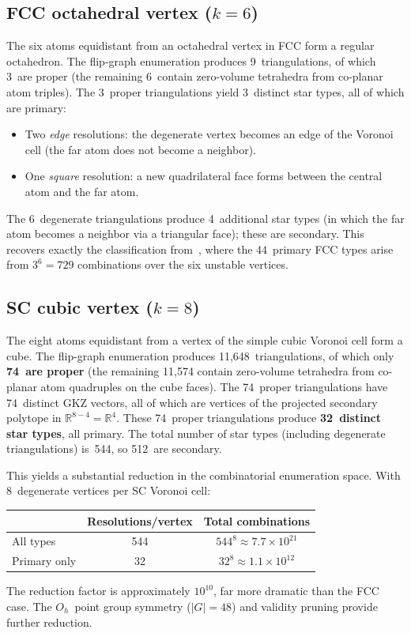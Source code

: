 \documentclass[11pt]{article}
\newcommand{\R}{\mathbb{R}}
\theoremstyle{definition}
\begin{document}
\subsection{FCC octahedral vertex ($k = 6$)}

The six atoms equidistant from an octahedral vertex in FCC form a
regular octahedron.  The flip-graph enumeration produces 9~triangulations,
of which 3~are proper (the remaining 6~contain zero-volume tetrahedra
from co-planar atom triples).  The 3~proper triangulations yield 3~distinct
star types, all of which are primary:
\begin{itemize}
  \item Two \emph{edge} resolutions: the degenerate vertex becomes an
    edge of the Voronoi cell (the far atom does not become a neighbor).
  \item One \emph{square} resolution: a new quadrilateral face forms
    between the central atom and the far atom.
\end{itemize}
The 6~degenerate triangulations produce 4~additional star types (in
which the far atom becomes a neighbor via a triangular face); these are
secondary.  This recovers exactly the classification
from~\cite{lazar2015}, where the 44~primary FCC types arise from
$3^6 = 729$ combinations over the six unstable vertices.

\subsection{SC cubic vertex ($k = 8$)}

The eight atoms equidistant from a vertex of the simple cubic Voronoi
cell form a cube.  The flip-graph enumeration produces
11{,}648~triangulations, of which only \textbf{74~are proper} (the
remaining 11{,}574 contain zero-volume tetrahedra from co-planar atom
quadruples on the cube faces).  The 74~proper triangulations have
74~distinct GKZ vectors, all of which are vertices of the projected
secondary polytope in $\R^{8-4} = \R^4$.  These 74~proper
triangulations produce \textbf{32~distinct star types}, all primary.
The total number of star types (including degenerate triangulations)
is~544, so 512~are secondary.

This yields a substantial reduction in the combinatorial enumeration
space.  With 8~degenerate vertices per SC Voronoi cell:
\begin{center}
\begin{tabular}{lcc}
  \hline
  & Resolutions/vertex & Total combinations \\
  \hline
  All types & 544 & $544^8 \approx 7.7 \times 10^{21}$ \\
  Primary only & 32 & $32^8 \approx 1.1 \times 10^{12}$ \\
  \hline
\end{tabular}
\end{center}
The reduction factor is approximately $10^{10}$, far more dramatic
than the FCC case.  The $O_h$~point group symmetry ($|G| = 48$) and
validity pruning provide further reduction.
\end{document}
